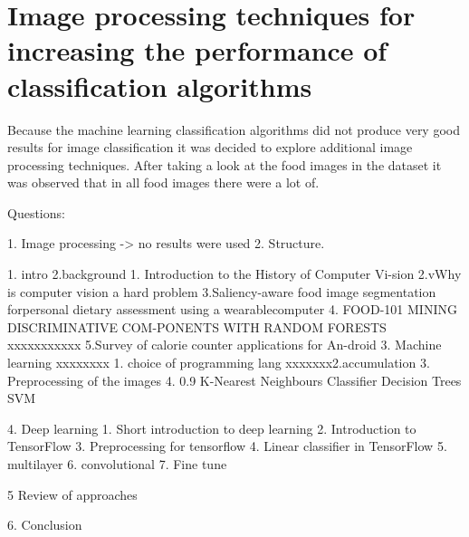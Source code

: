 \chapter{Image processing techniques for increasing the performance of classification algorithms}

Because the machine learning classification algorithms did not produce very good results for image classification it was decided to explore additional image processing techniques. After taking a look at the food images in the dataset it was observed that in all food images there were a lot of.

Questions:

1. Image processing -> no results were used
2. Structure.


1. intro
2.background
    1. Introduction to the History of Computer Vi-sion
    2.vWhy is computer vision a hard problem
      3.Saliency-aware food image segmentation forpersonal dietary assessment using a wearablecomputer
      4. FOOD-101  MINING DISCRIMINATIVE COM-PONENTS WITH RANDOM FORESTS
xxxxxxxxxxx 5.Survey of calorie counter applications for An-droid
3. Machine learning
   xxxxxxxx 1. choice of programming lang
    xxxxxxx2.accumulation
    3. Preprocessing of the images
    4. 0.9    K-Nearest Neighbours Classifier
     Decision Trees
     SVM
     
4. Deep learning
 1. Short introduction to deep learning
 2.  Introduction to TensorFlow
 3.  Preprocessing for tensorflow
 4.  Linear classifier in TensorFlow
 5. multilayer
 6. convolutional
 7. Fine tune
 
5 Review of approaches

6. Conclusion
 